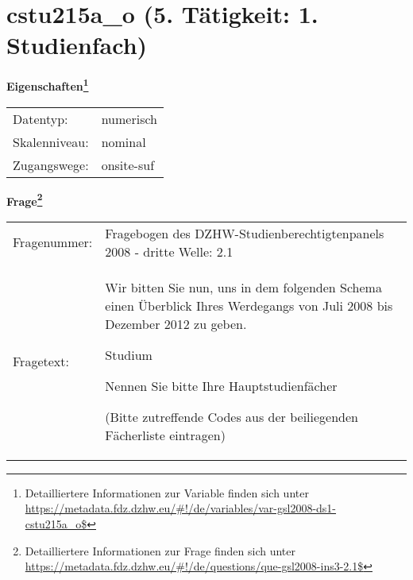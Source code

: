 
    \setcounter{footnote}{0}

    \vspace*{-1.8cm}
	\section{cstu215a\_o (5. Tätigkeit: 1. Studienfach)}
	\label{section:cstu215a_o}



    \vspace*{0.5cm}
    \noindent\textbf{Eigenschaften\footnote{Detailliertere Informationen zur Variable finden sich unter
		\url{https://metadata.fdz.dzhw.eu/\#!/de/variables/var-gsl2008-ds1-cstu215a_o$}}}\\
	\begin{tabularx}{\hsize}{@{}lX}
	Datentyp: & numerisch \\
	Skalenniveau: & nominal \\
	Zugangswege: &
	  onsite-suf
 \\
    \end{tabularx}



				\vspace*{0.5cm}
                \noindent\textbf{Frage\footnote{Detailliertere Informationen zur Frage finden sich unter
		              \url{https://metadata.fdz.dzhw.eu/\#!/de/questions/que-gsl2008-ins3-2.1$}}}\\
				\begin{tabularx}{\hsize}{@{}lX}
					Fragenummer: &
					  Fragebogen des DZHW-Studienberechtigtenpanels 2008 - dritte Welle:
					  2.1
 \\
					Fragetext: & Wir bitten Sie nun, uns in dem folgenden Schema einen Überblick Ihres Werdegangs von Juli 2008 bis Dezember 2012 zu geben.\par  Studium\par  Nennen Sie bitte Ihre Hauptstudienfächer\par  (Bitte zutreffende Codes aus der beiliegenden Fächerliste eintragen) \\
				\end{tabularx}





